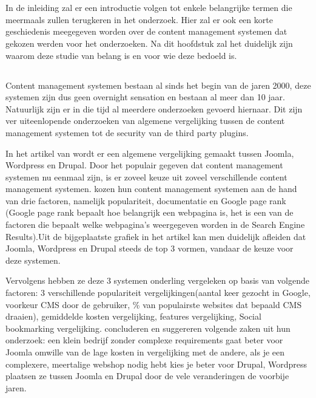 
\chapter{}
\label{ch:inleiding}

In de inleiding zal er een introductie volgen tot enkele belangrijke termen die meermaals zullen terugkeren in het onderzoek. Hier zal er ook een korte geschiedenis meegegeven worden over de content management systemen dat gekozen werden voor het onderzoeken. Na dit hoofdstuk zal het duidelijk zijn waarom deze studie van belang is en voor wie deze bedoeld is.
\section{}
\label{sec:probleemstelling}
Content management systemen bestaan al sinds het begin van de jaren 2000, deze systemen zijn dus geen overnight sensation en bestaan al meer dan 10 jaar. Natuurlijk zijn er in die tijd al meerdere onderzoeken gevoerd hiernaar. Dit zijn ver uiteenlopende onderzoeken van algemene vergelijking tussen de content management systemen tot de security van de third party plugins. 

In het artikel van \textcite{Patel2011} wordt er een algemene vergelijking gemaakt tussen Joomla, Wordpress en Drupal. Door het populair gegeven dat content management systemen nu eenmaal zijn, is er zoveel keuze uit zoveel verschillende content management systemen.
\textcite{Patel2011} kozen hun content management systemen aan de hand van drie factoren, namelijk populariteit, documentatie en Google page rank (Google page rank bepaalt hoe belangrijk een webpagina is, het is een van de factoren die bepaalt welke webpagina's weergegeven worden in de Search Engine Results).Uit de bijgeplaatste grafiek in het artikel kan men duidelijk afleiden dat Joomla, Wordpress en Drupal steeds de top 3 vormen, vandaar de keuze voor deze systemen.

Vervolgens hebben ze deze 3 systemen onderling vergeleken op basis van volgende factoren: 3 verschillende populariteit vergelijkingen(aantal keer gezocht in Google, voorkeur CMS door de gebruiker, \% van populairste websites dat bepaald CMS draaien), gemiddelde kosten vergelijking, features vergelijking, Social bookmarking vergelijking. \textcite{Patel2011} concluderen en suggereren volgende zaken uit hun onderzoek: een klein bedrijf zonder complexe requirements gaat beter voor Joomla omwille van de lage kosten in vergelijking met de andere, als je een complexere, meertalige webshop nodig hebt kies je beter voor Drupal, Wordpress plaatsen ze tussen Joomla en Drupal door de vele veranderingen de voorbije jaren.

